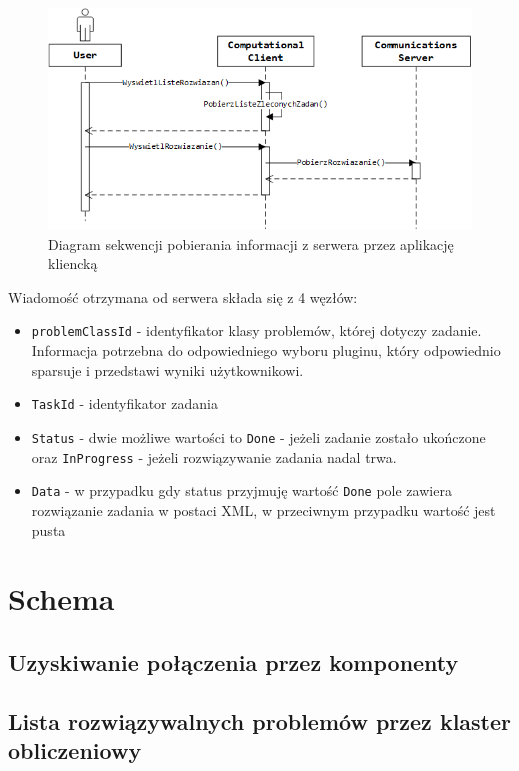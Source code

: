 \documentclass[12pt,a4paper,titlepage]{report}
\begin{document}
	 

	\begin{figure}[h]
		\centering
		\caption{Diagram sekwencji pobierania informacji z serwera przez aplikację kliencką}
		 \includegraphics[width=\textwidth]{img/communication/getresult.png}
	\end{figure} 	
	
	Wiadomość otrzymana od serwera składa się z 4 węzłów:
	\begin{itemize}
		\item \verb+problemClassId+ - identyfikator klasy problemów, której dotyczy zadanie. Informacja potrzebna do odpowiedniego wyboru 
		pluginu, który odpowiednio sparsuje i przedstawi wyniki użytkownikowi.
		\item \verb+TaskId+ - identyfikator zadania
		\item \verb+Status+ - dwie możliwe wartości to \verb+Done+ - jeżeli zadanie zostało ukończone oraz \verb+InProgress+ - jeżeli rozwiązywanie zadania nadal trwa.
		\item \verb+Data+ - w przypadku gdy status przyjmuję wartość \verb+Done+ pole zawiera rozwiązanie zadania w postaci XML,
		w przeciwnym przypadku wartość jest pusta
	\end{itemize}
	
	
	\section{Schema}
		\subsection{Uzyskiwanie połączenia przez komponenty}	
			
		\subsection{Lista rozwiązywalnych problemów przez klaster obliczeniowy}
			
\end{document}

